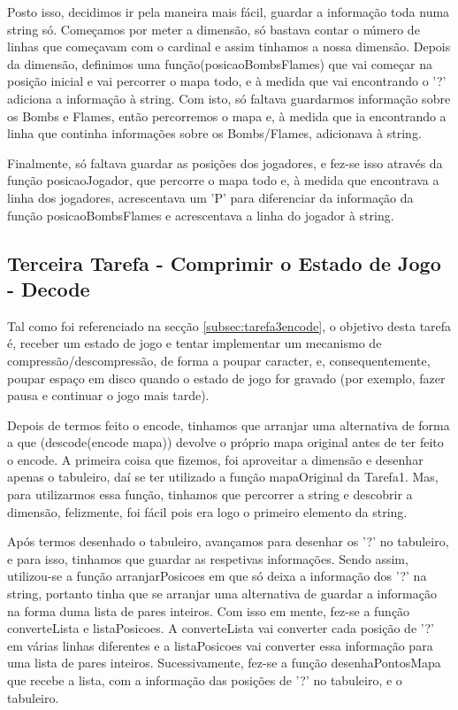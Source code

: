 \documentclass[a4paper]{article}
\begin{document}
Posto isso, decidimos ir pela maneira mais fácil, guardar a informação toda numa string só. Começamos por meter a dimensão, só bastava contar o número de linhas que começavam com o cardinal e assim tinhamos a nossa dimensão. Depois da dimensão, definimos uma função(posicaoBombsFlames) que vai começar na posição inicial e vai percorrer o mapa todo, e à medida que vai encontrando o '?' adiciona a informação à string. Com isto, só faltava guardarmos informação sobre os Bombs e Flames, então percorremos o mapa e, à medida que ia encontrando a linha que continha informações
sobre os Bombs/Flames, adicionava à string.

Finalmente, só faltava guardar as posições dos jogadores, e fez-se isso através da função posicaoJogador, que percorre o mapa todo e, à medida que encontrava a linha dos jogadores, acrescentava um 'P' para diferenciar da informação da função posicaoBombsFlames e acrescentava a linha do jogador à string.

\subsection{Terceira Tarefa - Comprimir o Estado de Jogo - Decode }
\label{subsec:tarefa3decode}

Tal como foi referenciado na secção \ref{subsec:tarefa3encode}, o objetivo desta tarefa é, receber um estado de jogo e tentar implementar um mecanismo de compressão/descompressão, de forma a poupar caracter, e, consequentemente, poupar
espaço em disco quando o estado de jogo for gravado (por exemplo, fazer pausa e continuar o jogo mais tarde).

Depois de termos feito o encode, tinhamos que arranjar uma alternativa de forma a que (descode(encode mapa)) devolve o próprio mapa original antes de ter feito o encode. A primeira coisa que fizemos, foi aproveitar a dimensão e desenhar apenas o tabuleiro, daí se ter utilizado a função mapaOriginal da Tarefa1. Mas, para utilizarmos essa função, tinhamos que percorrer a string e descobrir a dimensão, felizmente, foi fácil pois era logo o primeiro elemento da string.

Após termos desenhado o tabuleiro, avançamos para desenhar os '?' no tabuleiro, e para isso, tinhamos que guardar as respetivas informações. Sendo assim, utilizou-se a função
arranjarPosicoes em que só deixa a informação dos '?' na string, portanto tinha que se arranjar uma alternativa de guardar a informação na forma duma lista de pares inteiros. Com isso em mente, fez-se a função
converteLista e listaPosicoes. A converteLista vai converter cada posição de '?' em várias linhas diferentes e a listaPosicoes vai converter essa informação para uma lista de pares inteiros. Sucessivamente, fez-se a função desenhaPontosMapa que recebe a lista, com a informação das posições de '?' no tabuleiro, e o tabuleiro.
\end{document}
